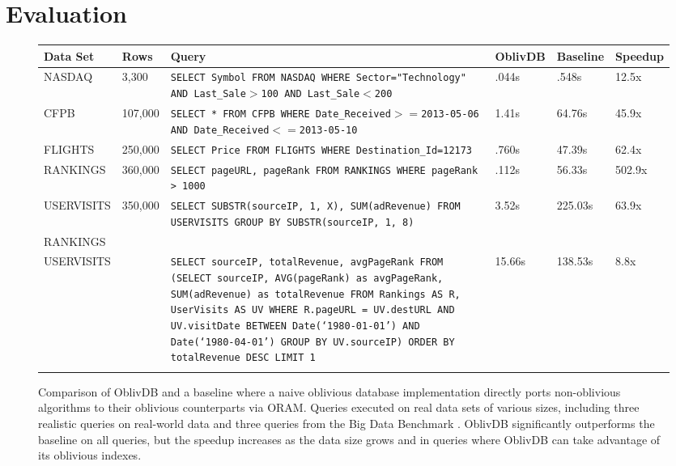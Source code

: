 \documentclass[conference]{IEEEtran}
\def\name/{OblivDB}
\begin{document}
\section{Evaluation}\label{eval}
\begin{figure}
\begin{tabular}{p{2.2cm} l p{7cm} l l l} 
 \textbf{Data Set}& \textbf{Rows} & \textbf{Query}& \textbf{\name/} & \textbf{Baseline} & \textbf{Speedup}\\ \hline\rule{0pt}{3ex}
NASDAQ & 3,300 &\texttt{SELECT Symbol FROM NASDAQ WHERE Sector="Technology" AND Last\_Sale$>$100 AND Last\_Sale$<$200} & .044s & .548s & 12.5x \\ \rule{0pt}{3ex}
CFPB & 107,000& \texttt{SELECT * FROM CFPB WHERE Date\_Received$>=$2013-05-06 AND Date\_Received$<=$2013-05-10 } & 1.41s & 64.76s & 45.9x\\\rule{0pt}{3ex} 
FLIGHTS & 250,000&\texttt{SELECT Price FROM FLIGHTS WHERE Destination\_Id=12173} & .760s & 47.39s & 62.4x\\\rule{0pt}{3ex}
RANKINGS & 360,000 & \texttt{SELECT pageURL, pageRank FROM RANKINGS WHERE pageRank > 1000 }& .112s & 56.33s& 502.9x \\\rule{0pt}{3ex}
USERVISITS & 350,000 & \texttt{SELECT SUBSTR(sourceIP, 1, X), SUM(adRevenue) FROM USERVISITS GROUP BY SUBSTR(sourceIP, 1, 8)}& 3.52s &225.03s & 63.9x\\\rule{0pt}{3ex}
RANKINGS \\ USERVISITS&  & \texttt{SELECT sourceIP, totalRevenue, avgPageRank
FROM
  (SELECT sourceIP,
          AVG(pageRank) as avgPageRank,
          SUM(adRevenue) as totalRevenue
    FROM Rankings AS R, UserVisits AS UV
    WHERE R.pageURL = UV.destURL
       AND UV.visitDate BETWEEN Date(`1980-01-01') AND Date(`1980-04-01')
    GROUP BY UV.sourceIP)
  ORDER BY totalRevenue DESC LIMIT 1} & 15.66s & 138.53s& 8.8x\\\rule{0pt}{3ex}
\end{tabular}
\caption{Comparison of \name/ and a baseline where a naive oblivious database implementation directly ports non-oblivious algorithms to their oblivious counterparts via ORAM. Queries executed on real data sets of various sizes, including three realistic queries on real-world data \cite{NASDAQ, CFPB, FLIGHT} and three queries from the Big Data Benchmark \cite{BDB}. \name/ significantly outperforms the baseline on all queries, but the speedup increases as the data size grows and in queries where \name/ can take advantage of its oblivious indexes.}
\label{figQueries}
\end{figure}
\end{document}
